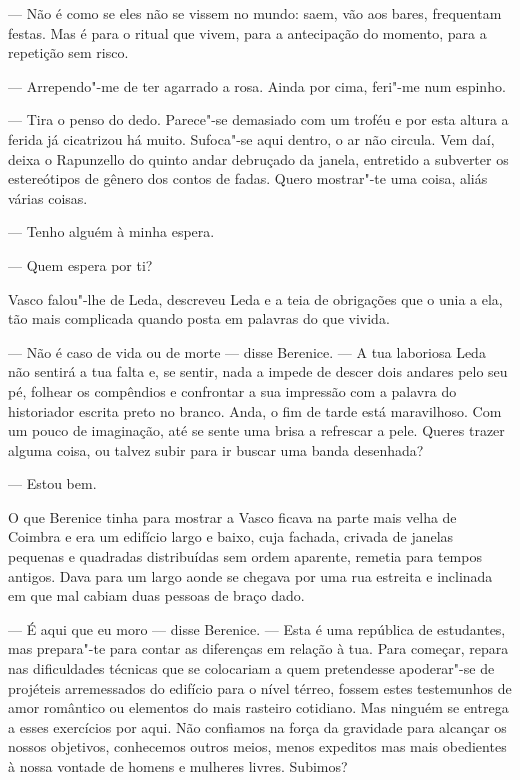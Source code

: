 --- Não é como se eles não se vissem no mundo: saem, vão aos bares,
  frequentam festas. Mas é para o ritual que vivem, para a antecipação
  do momento, para a repetição sem risco.

--- Arrependo"-me de ter agarrado a rosa. Ainda por cima, feri"-me num
  espinho.

--- Tira o penso do dedo. Parece"-se demasiado com um troféu e por esta
altura a ferida já cicatrizou há muito. Sufoca"-se aqui dentro, o ar
não circula. Vem daí, deixa o Rapunzello do quinto
andar debruçado da janela, entretido a subverter os estereótipos de
gênero dos contos de fadas. Quero mostrar"-te uma coisa, aliás várias
coisas.

--- Tenho alguém à minha espera.

--- Quem espera por ti?


Vasco falou"-lhe de Leda, descreveu Leda e a teia de obrigações que o
unia a ela, tão mais complicada quando posta em palavras do que vivida.

--- Não é caso de vida ou de morte --- disse Berenice. --- A tua laboriosa
  Leda não sentirá a tua falta e, se sentir, nada a impede de descer
  dois andares pelo seu pé, folhear os compêndios e confrontar a sua
  impressão com a palavra do historiador escrita preto no branco.
  Anda, o fim de tarde está maravilhoso. Com um pouco de imaginação,
  até se sente uma brisa a refrescar a pele. Queres trazer alguma coisa,
  ou talvez subir para ir buscar uma banda desenhada?

--- Estou bem.


O que Berenice tinha para mostrar a Vasco ficava na parte mais velha de
Coimbra e era um edifício largo e baixo, cuja fachada, crivada de
janelas pequenas e quadradas distribuídas sem ordem aparente, remetia
para tempos antigos. Dava para um largo aonde se chegava por uma rua
estreita e inclinada em que mal cabiam duas pessoas de braço dado.

--- É aqui que eu moro --- disse Berenice. --- Esta é uma república de
  estudantes, mas prepara"-te para contar as diferenças em relação à
  tua. Para começar, repara nas dificuldades
técnicas que se colocariam a quem pretendesse apoderar"-se de projéteis
arremessados do edifício para o nível térreo, fossem estes testemunhos
de amor romântico ou elementos do mais rasteiro cotidiano. Mas ninguém
se entrega a esses exercícios por aqui. Não confiamos na força da
gravidade para alcançar os nossos objetivos, conhecemos outros meios,
menos expeditos mas mais obedientes à nossa vontade de homens e mulheres livres. Subimos?


